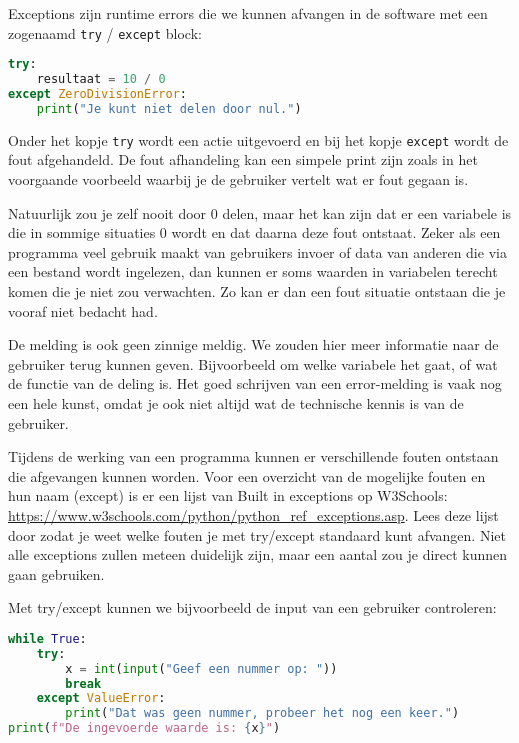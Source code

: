 Exceptions zijn runtime errors die we kunnen afvangen in de software met een zogenaamd \texttt{try} / \texttt{except} block:
\begin{lstlisting}[language=python]
try:
    resultaat = 10 / 0
except ZeroDivisionError:
    print("Je kunt niet delen door nul.")
\end{lstlisting}

Onder het kopje \texttt{try} wordt een actie uitgevoerd en bij het kopje \texttt{except} wordt de fout afgehandeld. De fout afhandeling kan een simpele print zijn zoals in het voorgaande voorbeeld waarbij je de gebruiker vertelt wat er fout gegaan is.

Natuurlijk zou je zelf nooit door 0 delen, maar het kan zijn dat er een variabele is die in sommige situaties 0 wordt en dat daarna deze fout ontstaat. Zeker als een programma veel gebruik maakt van gebruikers invoer of data van anderen die via een bestand wordt ingelezen, dan kunnen er soms waarden in variabelen terecht komen die je niet zou verwachten. Zo kan er dan een fout situatie ontstaan die je vooraf niet bedacht had.

De melding  is ook geen zinnige meldig. We zouden hier meer informatie naar de gebruiker terug kunnen geven. Bijvoorbeeld om welke variabele het gaat, of wat de functie van de deling is. Het goed schrijven van een error-melding is vaak nog een hele kunst, omdat je ook niet altijd wat de technische kennis is van de gebruiker.

Tijdens de werking van een programma kunnen er verschillende fouten ontstaan die afgevangen kunnen worden. Voor een overzicht van de mogelijke fouten en hun naam (except) is er een lijst van Built in exceptions op W3Schools: \url{https://www.w3schools.com/python/python_ref_exceptions.asp}. Lees deze lijst door zodat je weet welke fouten je met try/except standaard kunt afvangen. Niet alle exceptions zullen meteen duidelijk zijn, maar een aantal zou je direct kunnen gaan gebruiken.

Met try/except kunnen we bijvoorbeeld de input van een gebruiker controleren:
\begin{lstlisting}[language=python]
while True:
    try:
        x = int(input("Geef een nummer op: "))
        break
    except ValueError:
        print("Dat was geen nummer, probeer het nog een keer.")
print(f"De ingevoerde waarde is: {x}")
\end{lstlisting}

